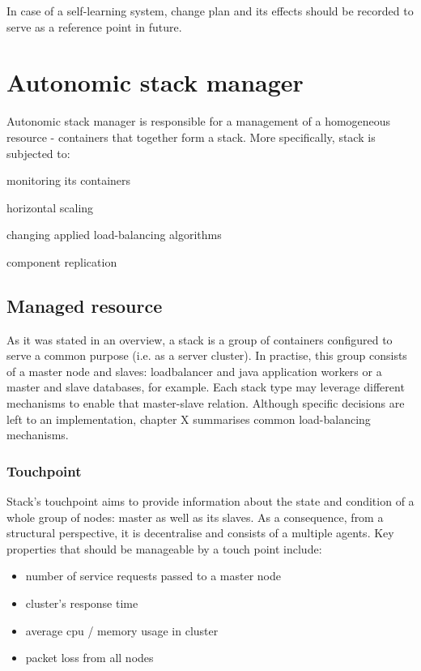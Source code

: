In case of a self-learning system, change plan and its effects should be recorded to serve as a reference point in future.

\section{Autonomic stack manager}
Autonomic stack manager is responsible for a management of a homogeneous resource - containers that together form a stack. More specifically, stack is subjected to:
\begin{inparaenum}[a)]
 \item monitoring its containers
 \item horizontal scaling
 \item changing applied load-balancing algorithms
 \item component replication
\end{inparaenum}

\subsection{Managed resource}
As it was stated in an overview, a stack is a group of containers configured to serve a common purpose (i.e. as a server cluster). In practise, this group consists of a master node and slaves: loadbalancer and java application workers or a master and slave databases, for example. Each stack type may leverage different mechanisms to enable that master-slave relation. Although specific decisions are left to an implementation, chapter X summarises common load-balancing mechanisms.

\subsubsection{Touchpoint}
Stack's touchpoint aims to provide information about the state and condition of a whole group of nodes: master as well as its slaves. As a consequence, from a structural perspective, it is decentralise and consists of a multiple agents. Key properties that should be manageable by a touch point include:
\begin{itemize}
 \item number of service requests passed to a master node
 \item cluster's response time
 \item average cpu / memory usage in cluster
 \item packet loss from all nodes
\end{itemize}

